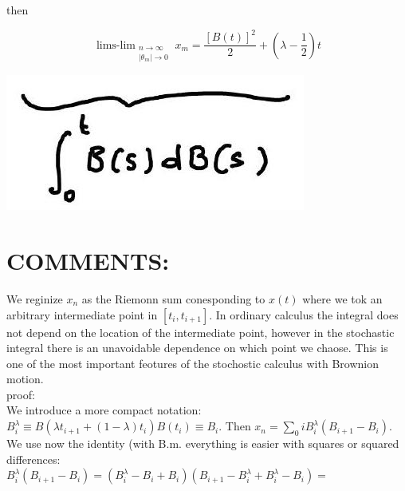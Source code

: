 \documentclass[10pt]{article}
\begin{document}
then


\begin{equation*}
\operatorname{lims-lim}_{\substack{n \rightarrow \infty \\\left|\theta_{m}\right| \rightarrow 0}} x_{m}=\frac{[B(t)]^{2}}{2}+\left(\lambda-\frac{1}{2}\right) t \tag{31}
\end{equation*}


\begin{center}
\includegraphics[max width=\textwidth]{2025_10_17_a59e220b8a74630d2381g-07}
\end{center}

\section*{COMMENTS:}
We reginize $x_{n}$ as the Riemonn sum conesponding to $x(t)$ where we tok an arbitrary intermediate point in $\left[t_{i}, t_{i+1}\right]$. In ordinary calculus the integral does not depend on the location of the intermediate point, however in the stochastic integral there is an unavoidable dependence on which point we chaose. This is one of the most important feotures of the stochostic calculus with Brownion motion.\\
proof:\\
We introduce a more compact notation: $B_{i}^{\lambda} \equiv B\left(\lambda t_{i+1}+(1-\lambda) t_{i}\right) B\left(t_{i}\right) \equiv B_{i}$. Then $x_{n}=\sum_{0} i B_{i}^{\lambda}\left(B_{i+1}-B_{i}\right)$.\\
We use now the identity (with B.m. everything is easier with squares or squared differences:\\
$B_{i}^{\lambda}\left(B_{i+1}-B_{i}\right)=\left(B_{i}^{\lambda}-B_{i}+B_{i}\right)\left(B_{i+1}-B_{i}^{\lambda}+B_{i}^{\lambda}-B_{i}\right)=$
\end{document}
